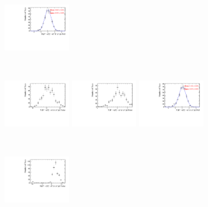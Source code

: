 \begin{figure}[!h]
\begin{subfigure}[t]{1.0\textwidth}
      \includegraphics[width=0.32\textwidth]{figs/B2DsPhi/Plots_DsKK_Pull_yield_peak_total_DsPhi_Ds2KKPi_toy_both_DsBDTbin1_PhiBDTbin1_both_both.pdf}
      \caption{\decay{\Dsp}{\Kp\Km\pip}}
   \end{subfigure}\\
   \begin{subfigure}[t]{1.0\textwidth}
      \includegraphics[width=0.32\textwidth]{figs/B2DsPhi/Plots_DsKK_Value_yield_peak_total_DsPhi_Ds2PiPiPi_toy_both_DsBDTbin1_PhiBDTbin1_both_both.pdf}
      \includegraphics[width=0.32\textwidth]{figs/B2DsPhi/Plots_DsKK_Error_yield_peak_total_DsPhi_Ds2PiPiPi_toy_both_DsBDTbin1_PhiBDTbin1_both_both.pdf}
      \includegraphics[width=0.32\textwidth]{figs/B2DsPhi/Plots_DsKK_Pull_yield_peak_total_DsPhi_Ds2PiPiPi_toy_both_DsBDTbin1_PhiBDTbin1_both_both.pdf}
      \caption{\decay{\Dsp}{\pip\pim\pip}}
   \end{subfigure}\\
   \begin{subfigure}[t]{1.0\textwidth}
      \includegraphics[width=0.32\textwidth]{figs/B2DsPhi/Plots_DsKK_Value_yield_peak_total_DsPhi_Ds2KPiPi_toy_both_DsBDTbin1_PhiBDTbin1_both_both.pdf}

\end{subfigure}
\end{figure}
